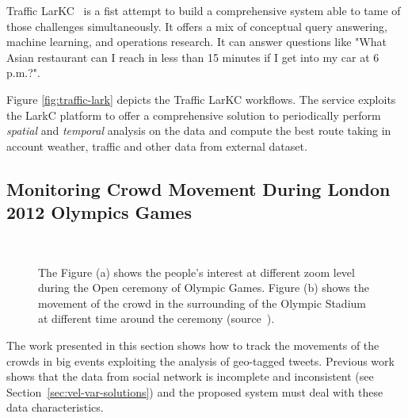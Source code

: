 Traffic LarKC~\cite{DBLP:journals/internet/ValleCDGST11} is a fist attempt to build a comprehensive system able to tame of those challenges simultaneously.
It offers a mix of conceptual query answering, machine learning, and operations research.
It can answer questions like "What Asian restaurant can I reach in less than 15 minutes if I get into my car at 6 p.m.?". 

Figure \ref{fig:traffic-lark} depicts the Traffic LarKC workflows. The service exploits the LarkC platform\cite{DBLP:conf/semco/FenselHABCVFHKLSTWWZ08} to offer a comprehensive solution to periodically perform \textit{spatial} and \textit{temporal} analysis on the data and compute the best route taking in account weather, traffic and other data from external dataset.

\subsection{Monitoring Crowd Movement During London 2012 Olympics Games} \label{sec:uda-london}

\begin{figure}[t]
\centering
{} \\ 
\caption{The Figure (a) shows the people's interest at different zoom level during the Open ceremony of Olympic Games. Figure (b) shows the movement of the crowd in the surrounding of the Olympic Stadium at different time around the ceremony (source~\cite{DBLP:conf/semweb/BalduiniVDTPC13}).}
\label{fig:london-move}
\end{figure}

The work presented in this section shows how to track the movements of the crowds in big events exploiting the analysis of geo-tagged tweets.
Previous work shows that the data from social network is incomplete and inconsistent (see Section~\ref{sec:vel-var-solutions}) and the proposed system must deal with these data characteristics.

